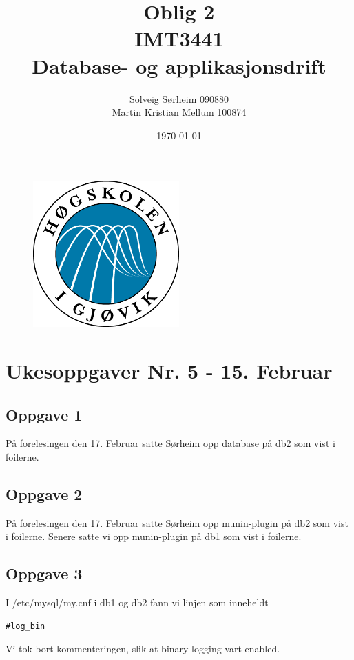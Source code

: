 \documentclass[a4paper, norsk, 12pt]{article}
\title{Oblig 2 \\ IMT3441 \\ Database- og applikasjonsdrift}
\author{Solveig Sørheim 090880 \\ Martin Kristian Mellum 100874}
\date{\today}
\begin{document}
\begin{figure}[h!]
 \centering
  \includegraphics[width=0.5\textwidth]{Images/hig_logo.png}
 \maketitle       %
\end{figure}
\pagebreak
\tableofcontents %
\pagebreak	%


\section{Ukesoppgaver Nr. 5 - 15. Februar}
\subsection{Oppgave 1}
På forelesingen den 17. Februar satte Sørheim opp database på db2 som vist i foilerne.

\subsection{Oppgave 2}
På forelesingen den 17. Februar satte Sørheim opp munin-plugin på db2 som vist i foilerne. Senere satte vi opp munin-plugin på db1 som vist i foilerne.

\subsection{Oppgave 3}
I /etc/mysql/my.cnf i db1 og db2 fann vi linjen som inneheldt
\begin{verbatim}
#log_bin
\end{verbatim}
Vi tok bort kommenteringen, slik at binary logging vart enabled.
\end{document}
